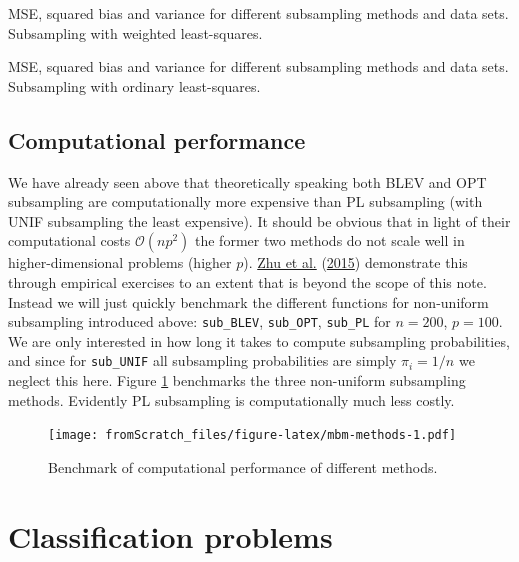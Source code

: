\documentclass[
]{book}
\begin{document}
\hypertarget{htmlwidget-7094aa462993607da3c4}{}

\label{fig:wls-zhu}MSE, squared bias and variance for different subsampling methods and data sets. Subsampling with weighted least-squares.

\hypertarget{htmlwidget-dbec5bbd8b33875f58ac}{}

\label{fig:ols-zhu}MSE, squared bias and variance for different subsampling methods and data sets. Subsampling with ordinary least-squares.

\hypertarget{computational-performance}{%
\subsection{Computational performance}\label{computational-performance}}

We have already seen above that theoretically speaking both BLEV and OPT subsampling are computationally more expensive than PL subsampling (with UNIF subsampling the least expensive). It should be obvious that in light of their computational costs \(\mathcal{O}(np^2)\) the former two methods do not scale well in higher-dimensional problems (higher \(p\)). \protect\hyperlink{ref-zhu2015optimal}{Zhu et al.} (\protect\hyperlink{ref-zhu2015optimal}{2015}) demonstrate this through empirical exercises to an extent that is beyond the scope of this note. Instead we will just quickly benchmark the different functions for non-uniform subsampling introduced above: \texttt{sub\_BLEV}, \texttt{sub\_OPT}, \texttt{sub\_PL} for \(n=200\), \(p=100\). We are only interested in how long it takes to compute subsampling probabilities, and since for \texttt{sub\_UNIF} all subsampling probabilities are simply \(\pi_i=1/n\) we neglect this here. Figure \ref{fig:mbm-methods} benchmarks the three non-uniform subsampling methods. Evidently PL subsampling is computationally much less costly.

\begin{figure}
\centering
\texttt{[image: fromScratch\_files/figure-latex/mbm-methods-1.pdf]}
\caption{\label{fig:mbm-methods}Benchmark of computational performance of different methods.}
\end{figure}

\hypertarget{classification-problems}{%
\section{Classification problems}\label{classification-problems}}
\end{document}

